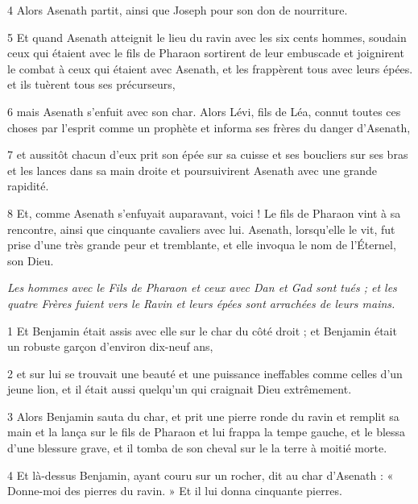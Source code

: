 \par 4 Alors Asenath partit, ainsi que Joseph pour son don de nourriture.

\par 5 Et quand Asenath atteignit le lieu du ravin avec les six cents hommes, soudain ceux qui étaient avec le fils de Pharaon sortirent de leur embuscade et joignirent le combat à ceux qui étaient avec Asenath, et les frappèrent tous avec leurs épées. et ils tuèrent tous ses précurseurs,

\par 6 mais Asenath s'enfuit avec son char. Alors Lévi, fils de Léa, connut toutes ces choses par l'esprit comme un prophète et informa ses frères du danger d'Asenath,

\par 7 et aussitôt chacun d'eux prit son épée sur sa cuisse et ses boucliers sur ses bras et les lances dans sa main droite et poursuivirent Asenath avec une grande rapidité.

\par 8 Et, comme Asenath s'enfuyait auparavant, voici ! Le fils de Pharaon vint à sa rencontre, ainsi que cinquante cavaliers avec lui. Asenath, lorsqu'elle le vit, fut prise d'une très grande peur et tremblante, et elle invoqua le nom de l'Éternel, son Dieu.


\par \textit{Les hommes avec le Fils de Pharaon et ceux avec Dan et Gad sont tués ; et les quatre Frères fuient vers le Ravin et leurs épées sont arrachées de leurs mains.}


\par 1 Et Benjamin était assis avec elle sur le char du côté droit ; et Benjamin était un robuste garçon d'environ dix-neuf ans,

\par 2 et sur lui se trouvait une beauté et une puissance ineffables comme celles d'un jeune lion, et il était aussi quelqu'un qui craignait Dieu extrêmement.

\par 3 Alors Benjamin sauta du char, et prit une pierre ronde du ravin et remplit sa main et la lança sur le fils de Pharaon et lui frappa la tempe gauche, et le blessa d'une blessure grave, et il tomba de son cheval sur le la terre à moitié morte.

\par 4 Et là-dessus Benjamin, ayant couru sur un rocher, dit au char d'Asenath : « Donne-moi des pierres du ravin. » Et il lui donna cinquante pierres.

